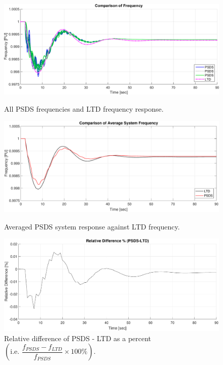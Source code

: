 \documentclass[12pt]{article}
\begin{document}
	\begin{figure}[ht!]
			\begin{center}
				\includegraphics[width=\linewidth]{fcomp}\vspace{-1em}
				\caption{All PSDS frequencies and LTD frequency response.}\vspace{1em}
				\label{fcomp}		 
		
				\includegraphics[width=.95\linewidth]{aveF}  \vspace{-1em}
				\caption{Averaged PSDS system response against LTD frequency.}\vspace{+.5em}
				\label{aveF}
					
				\includegraphics[width=.95\linewidth]{redDif}  \vspace{-1em}
				\caption{Relative difference of PSDS - LTD as a percent $\left( \text{i.e. }  \dfrac{f_{PSDS}- f_{LTD}}{f_{PSDS}} \times 100\% \right)$.}
				\label{redDif}
			\end{center}
		\end{figure}
\end{document}
